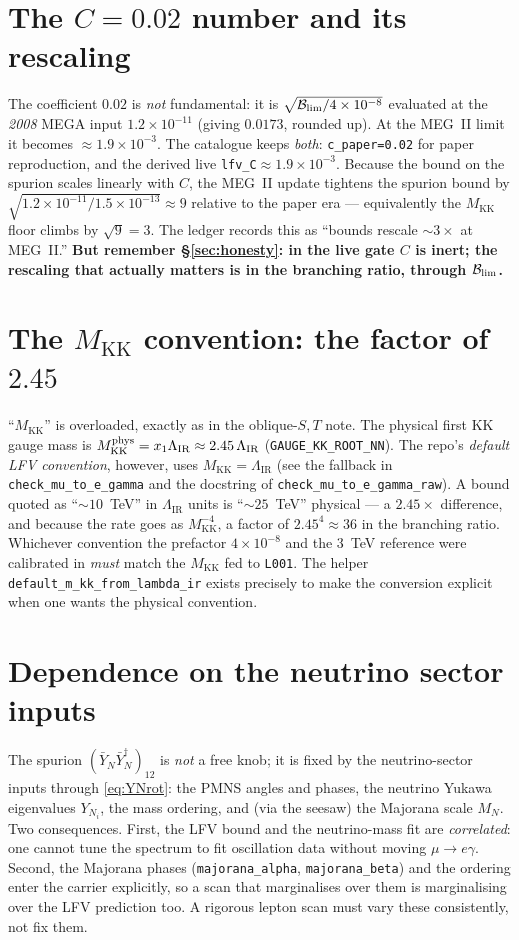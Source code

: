 \documentclass[11pt]{article}
\newcommand{\MKK}{M_{\mathrm{KK}}}
\newcommand{\LIR}{\Lambda_{\mathrm{IR}}}
\newcommand{\YNb}{\bar Y_N}
\newcommand{\spur}{(\YNb\YNb^\dagger)_{12}}
\newcommand{\BR}{\mathcal{B}}
\newcommand{\code}[1]{\texttt{#1}}
\theoremstyle{definition}
\begin{document}
\section{The $C=0.02$ number and its rescaling}
\label{sec:Cnumber}
The coefficient $0.02$ is \emph{not} fundamental: it is
$\sqrt{\BR_{\rm lim}/4\times10^{-8}}$ evaluated at the \emph{2008} MEGA input
$1.2\times10^{-11}$ (giving $0.0173$, rounded up). At the MEG~II limit it becomes
$\approx 1.9\times10^{-3}$. The catalogue keeps \emph{both}: \code{c\_paper=0.02}
for paper reproduction, and the derived live \code{lfv\_C}$\approx 1.9\times10^{-3}$.
Because the bound on the spurion scales linearly with $C$, the MEG~II update
tightens the spurion bound by $\sqrt{1.2\times10^{-11}/1.5\times10^{-13}}\approx 9$
relative to the paper era --- equivalently the $\MKK$ floor climbs by $\sqrt{9}=3$.
The ledger records this as ``bounds rescale $\sim 3\times$ at MEG~II.''
\textbf{But remember \S\ref{sec:honesty}: in the live gate $C$ is inert; the
rescaling that actually matters is in the branching ratio, through $\BR_{\rm lim}$.}

\section{The $\MKK$ convention: the factor of $2.45$}
\label{sec:Mconvention}
``$\MKK$'' is overloaded, exactly as in the oblique-$S,T$ note. The physical
first KK gauge mass is $\MKK^{\rm phys}=x_1\LIR\approx 2.45\,\LIR$
(\code{GAUGE\_KK\_ROOT\_NN}). The repo's \emph{default LFV convention}, however,
uses $\MKK=\LIR$ (see the fallback in \code{check\_mu\_to\_e\_gamma} and the
docstring of \code{check\_mu\_to\_e\_gamma\_raw}). A bound quoted as ``$\sim10$~TeV''
in $\LIR$ units is ``$\sim 25$~TeV'' physical --- a $2.45\times$ difference, and
because the rate goes as $\MKK^{-4}$, a factor of $2.45^4\approx 36$ in the
branching ratio. Whichever convention the prefactor $4\times10^{-8}$ and the
$3$~TeV reference were calibrated in \emph{must} match the $\MKK$ fed to
\code{L001}. The helper \code{default\_m\_kk\_from\_lambda\_ir} exists precisely to
make the conversion explicit when one wants the physical convention.

\section{Dependence on the neutrino sector inputs}
The spurion $\spur$ is \emph{not} a free knob; it is fixed by the neutrino-sector
inputs through \eqref{eq:YNrot}: the PMNS angles and phases, the neutrino Yukawa
eigenvalues $Y_{N_i}$, the mass ordering, and (via the seesaw) the Majorana scale
$M_N$. Two consequences. First, the LFV bound and the neutrino-mass fit are
\emph{correlated}: one cannot tune the spectrum to fit oscillation data without
moving $\mu\to e\gamma$. Second, the Majorana phases (\code{majorana\_alpha},
\code{majorana\_beta}) and the ordering enter the carrier explicitly, so a scan
that marginalises over them is marginalising over the LFV prediction too. A
rigorous lepton scan must vary these consistently, not fix them.
\end{document}
